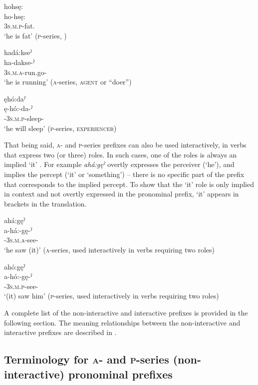 \ex hohsę: \\\label{ex:haho100b}
\gll ho-hsę:\\
\textsc{3s.m.p}-fat.{\stative}\\
\glt ‘he is fat’ (\textsc{p}-series, )

\ex hadá:kseˀ \\\label{ex:haho100c}
\gll ha-dakse-ˀ \\
\textsc{3s.m.a}-run.go-{\stative}\\
\glt ‘he is running’ (\textsc{a}-series, \textsc{agent} or “doer”)

\ex ęhó:daˀ \\\label{ex:haho100d}
\gll ę-hó:-da-ˀ\\
\fut-\textsc{3s.m.p}-sleep-{\punctual}\\
\glt ‘he will sleep’ (\textsc{p}-series, \textsc{experiencer})
\z
\z

That being said, \textsc{a}- and \textsc{p}-series prefixes can also be used interactively, in verbs that express two (or three) roles. In such cases, one of the roles is always an implied ‘it’ . For example \textit{ahá:gęˀ} overtly expresses the perceiver (‘he’), and implies the percept (‘it’ or ‘something’) -- there is no specific part of the prefix that corresponds to the implied percept. To show that the ‘it’ role is only implied in context and not overtly expressed in the pronominal prefix, ‘it’ appears in brackets in the translation. 

\ea\label{ex:haho200}
\ea ahá:gęˀ\\
\gll a-há:-gę-ˀ\\
{\factual}-\textsc{3s.m.a}-see-{\punctual}\\
\glt ‘he saw (it)’ (\textsc{a}-series, used interactively in verbs requiring two roles)

\ex ahó:gęˀ \\
\gll a-hó:-gę-ˀ\\
{\factual}-\textsc{3s.m.p}-see-{\punctual}\\
\glt ‘(it) saw him’ (\textsc{p}-series, used interactively in verbs requiring two roles)
\z
\z

A complete list of the non-interactive and interactive prefixes is provided in the following section. The meaning relationships between the non-interactive and interactive prefixes are described in .


\subsection{Terminology for \textsc{a}- and \textsc{p}-series (non-interactive) pronominal prefixes} \label{Terminology for non-interactive (A or O) pronominal prefixes}
\largerpage

